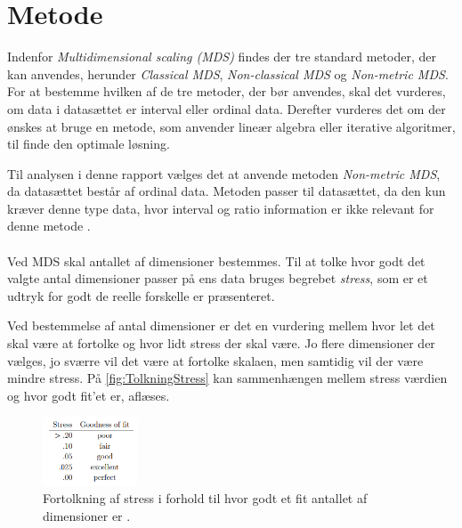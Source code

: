\section*{Metode}
\label{Metode}
%
Indenfor \textit{Multidimensional scaling (MDS)} findes der tre standard metoder, der kan anvendes, herunder \textit{Classical MDS}, \textit{Non-classical MDS} og \textit{Non-metric MDS}. For at bestemme hvilken af de tre metoder, der bør anvendes, skal det vurderes, om data i datasættet er interval eller ordinal data. Derefter vurderes det om der ønskes at bruge en metode, som anvender lineær algebra eller iterative algoritmer, til finde den optimale løsning. 

Til analysen i denne rapport vælges det at anvende metoden \textit{Non-metric MDS}, da datasættet består af ordinal data. Metoden passer til datasættet, da den kun kræver denne type data, hvor interval og ratio information er ikke relevant for denne metode \parencite[p.9]{Wickelmaier2003}. 
\\\\
Ved MDS skal antallet af dimensioner bestemmes. Til at tolke hvor godt det valgte antal dimensioner passer på ens data bruges begrebet \textit{stress}, som er et udtryk for godt de reelle forskelle er præsenteret. 

Ved bestemmelse af antal dimensioner er det en vurdering mellem hvor let det skal være at fortolke og hvor lidt stress der skal være. Jo flere dimensioner der vælges, jo sværre vil det være at fortolke skalaen, men samtidig vil der være mindre stress. På \autoref{fig:TolkningStress} kan sammenhængen mellem stress værdien og hvor godt fit'et er, aflæses. 

\begin{figure}[H]
\centering
\includegraphics[width = 0.25\textwidth]{Figure/TolkningStress.PNG} 
\caption{Fortolkning af stress i forhold til hvor godt et fit antallet af dimensioner er \parencite[p.13]{Wickelmaier2003}. }
\label{fig:TolkningStress}
\end{figure}

